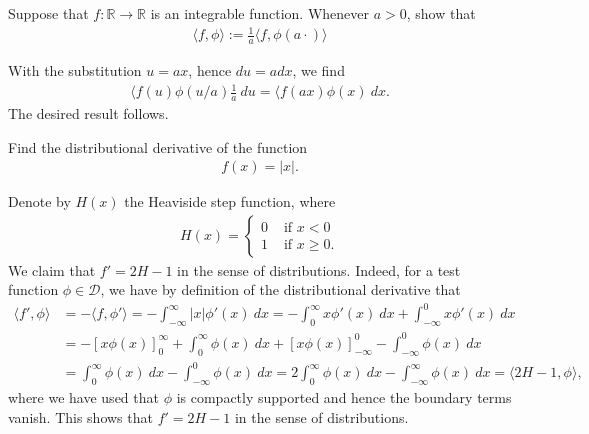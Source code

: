 \documentclass[11pt]{article}
\begin{document}
\begin{exercise}
    Suppose that $f : \mathbb R \rightarrow \mathbb R$ is an integrable function. 
    Whenever $a > 0$, show that 
    \begin{align}
        \langle f, \phi \rangle := \frac{1}{a} \langle f, \phi(a \cdot) \rangle 
    \end{align}
\end{exercise}
\begin{solution}
    With the substitution $u = ax$, hence $du = a dx$, we find 
    \begin{align}
        \langle f(u) \phi(u/a) \frac 1 a \ d u
        = 
        \langle f(ax) \phi(x) \ d x 
        .
    \end{align}
    The desired result follows. 
\end{solution}



\begin{exercise}
    Find the distributional derivative of the function 
    \begin{align}
        f(x) = |x|.
    \end{align}
\end{exercise}
\begin{solution}
    Denote by $H(x)$ the Heaviside step function, where
    \begin{align}
        H(x) = \begin{cases}
                0 & \text{ if } x < 0 \\
                1 & \text{ if } x \geq 0.
               \end{cases}
    \end{align}
    We claim that $f' = 2 H - 1$ in the sense of distributions. Indeed, for a test function $\phi \in \mathcal{D}$,
     we have by definition of the distributional derivative that
    \begin{align}
        \langle f', \phi \rangle &= - \langle f, \phi' \rangle = - \int_{-\infty}^{\infty} |x| \phi'(x) \ dx = - \int_0^\infty x \phi'(x) \ dx + \int_{-\infty}^0 x\phi'(x) \ dx \\
        &= -[x \phi(x)]_0^\infty + \int_0^\infty \phi(x) \ dx + [x \phi(x)]_{-\infty}^0 - \int_{-\infty}^0 \phi(x) \ dx \\
        &= \int_0^\infty \phi(x) \ dx - \int_{-\infty}^0 \phi(x) \ dx = 2 \int_0^\infty \phi(x) \ dx - \int_{-\infty}^{\infty} \phi(x) \ dx = \langle 2H - 1, \phi \rangle,
    \end{align}
    where we have used that $\phi$ is compactly supported and hence the boundary terms vanish. This shows that $f' = 2H - 1$ in the sense of distributions.
\end{solution}
\end{document}
